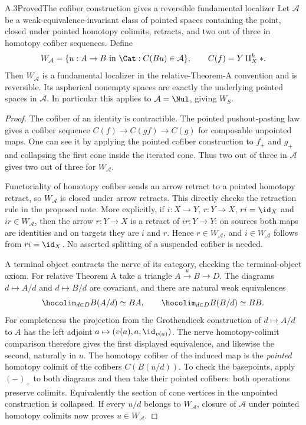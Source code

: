 \begin{claim}{A.3}{Proved}{The cofiber construction gives a reversible fundamental localizer}\label{A3}
Let $\mathcal A$ be a weak-equivalence-invariant class of pointed spaces containing the point, closed under pointed homotopy colimits, retracts, and two out of three in homotopy cofiber sequences. Define
\[
 W_{\mathcal A}=\{u:A\to B\text{ in }\Cat:C(Bu)\in\mathcal A\},
 \qquad C(f)=Y\amalg_X^h *.
\]
Then $W_{\mathcal A}$ is a fundamental localizer in the relative-Theorem-A convention and is reversible. Its aspherical nonempty spaces are exactly the underlying pointed spaces in $\mathcal A$. In particular this applies to $\mathcal A=\Nul$, giving $W_S$.
\end{claim}
\begin{proof}
The cofiber of an identity is contractible. The pointed pushout-pasting law gives a cofiber sequence
$C(f)\to C(gf)\to C(g)$ for composable unpointed maps. One can see it by applying the pointed cofiber construction to $f_+$ and $g_+$ and collapsing the first cone inside the iterated cone. Thus two out of three in $\mathcal A$ gives two out of three for $W_{\mathcal A}$.

Functoriality of homotopy cofiber sends an arrow retract to a pointed homotopy retract, so $W_{\mathcal A}$ is closed under arrow retracts. This directly checks the retraction rule in the proposed note. More explicitly, if $i:X\to Y$, $r:Y\to X$, $ri=\id_X$ and $ir\in W_{\mathcal A}$, then the arrow $r:Y\to X$ is a retract of $ir:Y\to Y$: on sources both maps are identities and on targets they are $i$ and $r$. Hence $r\in W_{\mathcal A}$, and $i\in W_{\mathcal A}$ follows from $ri=\id_X$. No asserted splitting of a suspended cofiber is needed.

A terminal object contracts the nerve of its category, checking the terminal-object axiom. For relative Theorem A take a triangle $A\xrightarrow{u}B\to D$. The diagrams $d\mapsto A/d$ and $d\mapsto B/d$ are covariant, and there are natural weak equivalences
\[
 \hocolim_{d\in D}B(A/d)\simeq BA,
 \qquad \hocolim_{d\in D}B(B/d)\simeq BB.
\]
For completeness the projection from the Grothendieck construction of $d\mapsto A/d$ to $A$ has the left adjoint $a\mapsto(v(a),a,\id_{v(a)})$. The nerve homotopy-colimit comparison therefore gives the first displayed equivalence, and likewise the second, naturally in $u$. The homotopy cofiber of the induced map is the \emph{pointed} homotopy colimit of the cofibers $C(B(u/d))$. To check the basepoints, apply $(-)_+$ to both diagrams and then take their pointed cofibers: both operations preserve colimits. Equivalently the section of cone vertices in the unpointed construction is collapsed. If every $u/d$ belongs to $W_{\mathcal A}$, closure of $\mathcal A$ under pointed homotopy colimits now proves $u\in W_{\mathcal A}$.


\end{proof}
